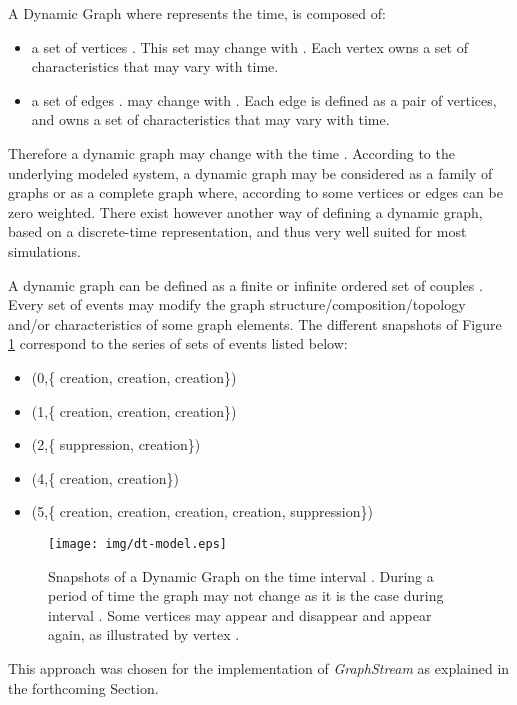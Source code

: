 \documentclass{svmult}
\begin{document}
A Dynamic Graph  where  represents the
time, is composed of:
\begin{itemize}
        \item a set of vertices . This set may change with . Each
          vertex  owns a set of characteristics  that may
          vary with time. 
        \item a set of edges .  may change with .
          Each edge  is defined as a pair of vertices, and
          owns a set of characteristics  that may vary with
          time. 
\end{itemize}

Therefore a dynamic graph  may change with the time . According to
the underlying modeled system, a dynamic graph may be considered as a family
of graphs or as a complete graph where, according to  some vertices or
edges can be zero weighted. 
There exist however another way of defining a dynamic graph, based on 
a discrete-time representation, and thus very well suited for most
simulations.

A dynamic graph can be defined as a finite or infinite ordered set of couples
. 
Every set of events may modify the graph structure/composition/topology and/or
characteristics of some graph elements.
The different snapshots of Figure \ref{fig:dt-model} correspond to the series
of sets of events listed below:

\begin{itemize}
\item[] (0,\{ creation,  creation,  creation\})
\item[] (1,\{ creation,  creation,  creation\})
\item[] (2,\{ suppression,  creation\})
\item[] (4,\{ creation,  creation\})
\item[] (5,\{ creation,  creation,  creation,  creation,  suppression\})
\end{itemize}

\begin{figure}[h]
        \centering
                \texttt{[image: img/dt-model.eps]}
        \caption{Snapshots of a Dynamic Graph on the time interval
                . During a period of time the graph may not change as
                it is the case during interval . Some vertices may
                appear and disappear and appear again, as illustrated by
                vertex .}
        \label{fig:dt-model}
\end{figure}

This approach was chosen for the implementation of \emph{GraphStream} as
explained in the forthcoming Section. 
\end{document}
